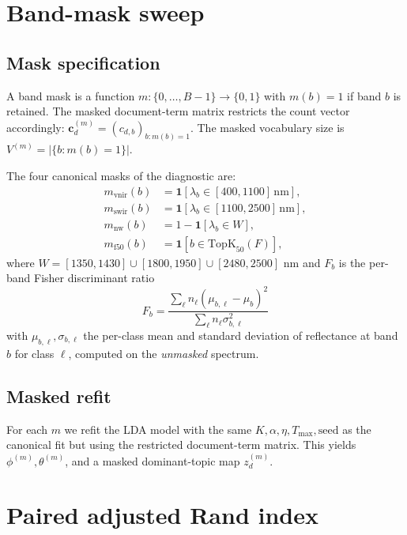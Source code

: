 \documentclass[11pt,a4paper]{article}
\begin{document}
\section{Band-mask sweep}

\subsection{Mask specification}

A band mask is a function $m : \{0, \ldots, B-1\} \to \{0, 1\}$ with
$m(b) = 1$ if band $b$ is retained. The masked document-term matrix
restricts the count vector accordingly: $\mathbf{c}_d^{(m)}
= (c_{d,b})_{b : m(b) = 1}$. The masked vocabulary size is
$V^{(m)} = |\{b : m(b) = 1\}|$.

The four canonical masks of the diagnostic are:
\begin{align}
m_{\text{vnir}}(b) &= \mathbf{1}[\lambda_b \in [400, 1100]\,\mathrm{nm}],
\\
m_{\text{swir}}(b) &= \mathbf{1}[\lambda_b \in [1100, 2500]\,\mathrm{nm}],
\\
m_{\text{nw}}(b) &= 1 - \mathbf{1}[\lambda_b \in W],
\\
m_{\text{f50}}(b) &= \mathbf{1}[b \in \mathrm{TopK}_{50}(F)],
\end{align}
where $W = [1350, 1430] \cup [1800, 1950] \cup [2480, 2500]$ nm and
$F_b$ is the per-band Fisher discriminant ratio
\begin{equation}
F_b = \frac{\sum_\ell n_\ell (\mu_{b,\ell} - \mu_b)^2}
            {\sum_\ell n_\ell \sigma_{b,\ell}^2}
\label{eq:fisher}
\end{equation}
with $\mu_{b,\ell}, \sigma_{b,\ell}$ the per-class mean and standard
deviation of reflectance at band $b$ for class $\ell$, computed on
the \emph{unmasked} spectrum.

\subsection{Masked refit}

For each $m$ we refit the LDA model with the same $K, \alpha, \eta,
T_{\max}, \mathrm{seed}$ as the canonical fit but using the restricted
document-term matrix. This yields $\phi^{(m)}, \theta^{(m)}$, and a
masked dominant-topic map $z^{(m)}_d$.

\section{Paired adjusted Rand index}
\end{document}
